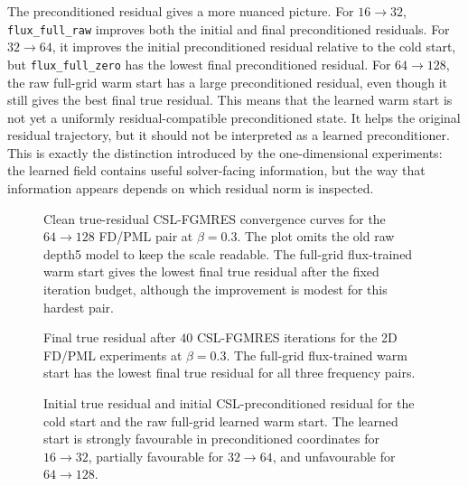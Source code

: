 The preconditioned residual gives a more nuanced picture. For $16\to32$,
\texttt{flux\_full\_raw} improves both the initial and final preconditioned
residuals. For $32\to64$, it improves the initial preconditioned residual
relative to the cold start, but \texttt{flux\_full\_zero} has the lowest final
preconditioned residual. For $64\to128$, the raw full-grid warm start has a
large preconditioned residual, even though it still gives the best final true
residual. This means that the learned warm start is not yet a uniformly
residual-compatible preconditioned state. It helps the original residual
trajectory, but it should not be interpreted as a learned preconditioner.
This is exactly the distinction introduced by the one-dimensional experiments:
the learned field contains useful solver-facing information, but the way that
information appears depends on which residual norm is inspected.

\begin{figure}[htbp]
    \centering
    \caption{Clean true-residual CSL-FGMRES convergence curves for the
    $64\to128$ FD/PML pair at $\beta=0.3$. The plot omits the old raw depth5
    model to keep the scale readable. The full-grid flux-trained warm start
    gives the lowest final true residual after the fixed iteration budget,
    although the improvement is modest for this hardest pair.}
    \label{fig:results-2d-gmres-clean-64-128}
\end{figure}

\begin{figure}[htbp]
    \centering
    \caption{Final true residual after $40$ CSL-FGMRES iterations for the
    2D FD/PML experiments at $\beta=0.3$. The full-grid flux-trained warm
    start has the lowest final true residual for all three frequency pairs.}
    \label{fig:results-2d-final-true-bars}
\end{figure}

\begin{figure}[htbp]
    \centering
    \caption{Initial true residual and initial CSL-preconditioned residual for
    the cold start and the raw full-grid learned warm start. The learned start
    is strongly favourable in preconditioned coordinates for $16\to32$,
    partially favourable for $32\to64$, and unfavourable for $64\to128$.}
    \label{fig:results-2d-initial-residual-comparison}
\end{figure}

